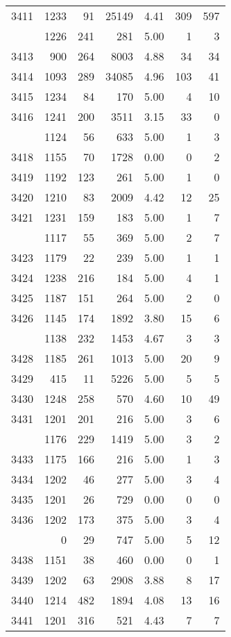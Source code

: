 \documentclass[
]{article}
\begin{document}
\begin{table}
\begin{tabular}[t]{lrrrrrr}
3411 & 1233 & 91 & 25149 & 4.41 & 309 & 597\\
\addlinespace
3412 & 1226 & 241 & 281 & 5.00 & 1 & 3\\
3413 & 900 & 264 & 8003 & 4.88 & 34 & 34\\
3414 & 1093 & 289 & 34085 & 4.96 & 103 & 41\\
3415 & 1234 & 84 & 170 & 5.00 & 4 & 10\\
3416 & 1241 & 200 & 3511 & 3.15 & 33 & 0\\
\addlinespace
3417 & 1124 & 56 & 633 & 5.00 & 1 & 3\\
3418 & 1155 & 70 & 1728 & 0.00 & 0 & 2\\
3419 & 1192 & 123 & 261 & 5.00 & 1 & 0\\
3420 & 1210 & 83 & 2009 & 4.42 & 12 & 25\\
3421 & 1231 & 159 & 183 & 5.00 & 1 & 7\\
\addlinespace
3422 & 1117 & 55 & 369 & 5.00 & 2 & 7\\
3423 & 1179 & 22 & 239 & 5.00 & 1 & 1\\
3424 & 1238 & 216 & 184 & 5.00 & 4 & 1\\
3425 & 1187 & 151 & 264 & 5.00 & 2 & 0\\
3426 & 1145 & 174 & 1892 & 3.80 & 15 & 6\\
\addlinespace
3427 & 1138 & 232 & 1453 & 4.67 & 3 & 3\\
3428 & 1185 & 261 & 1013 & 5.00 & 20 & 9\\
3429 & 415 & 11 & 5226 & 5.00 & 5 & 5\\
3430 & 1248 & 258 & 570 & 4.60 & 10 & 49\\
3431 & 1201 & 201 & 216 & 5.00 & 3 & 6\\
\addlinespace
3432 & 1176 & 229 & 1419 & 5.00 & 3 & 2\\
3433 & 1175 & 166 & 216 & 5.00 & 1 & 3\\
3434 & 1202 & 46 & 277 & 5.00 & 3 & 4\\
3435 & 1201 & 26 & 729 & 0.00 & 0 & 0\\
3436 & 1202 & 173 & 375 & 5.00 & 3 & 4\\
\addlinespace
3437 & 0 & 29 & 747 & 5.00 & 5 & 12\\
3438 & 1151 & 38 & 460 & 0.00 & 0 & 1\\
3439 & 1202 & 63 & 2908 & 3.88 & 8 & 17\\
3440 & 1214 & 482 & 1894 & 4.08 & 13 & 16\\
3441 & 1201 & 316 & 521 & 4.43 & 7 & 7\\

\end{tabular}
\end{table}
\end{document}
